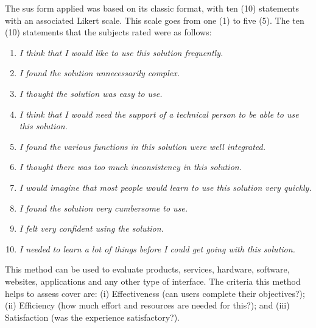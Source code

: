 The \ac{sus} form applied was based on its classic format, with ten (10) statements with an associated Likert scale.
This scale goes from one (1) to five (5).
The ten (10) statements that the subjects rated were as follows:

\begin{enumerate}
    \item {\scriptsize \textit{I think that I would like to use this solution frequently.}}
    \item {\scriptsize \textit{I found the solution unnecessarily complex.}}
    \item {\scriptsize \textit{I thought the solution was easy to use.}}
    \item {\scriptsize \textit{I think that I would need the support of a technical person to be able to use this solution.}}
    \item {\scriptsize \textit{I found the various functions in this solution were well integrated.}}
    \item {\scriptsize \textit{I thought there was too much inconsistency in this solution.}}
    \item {\scriptsize \textit{I would imagine that most people would learn to use this solution very quickly.}}
    \item {\scriptsize \textit{I found the solution very cumbersome to use.}}
    \item {\scriptsize \textit{I felt very confident using the solution.}}
    \item {\scriptsize \textit{I needed to learn a lot of things before I could get going with this solution.}}
\end{enumerate}

This method can be used to evaluate products, services, hardware, software, websites, applications and any other type of interface.
The criteria this method helps to assess cover are: (i) Effectiveness (can users complete their objectives?); (ii) Efficiency (how much effort and resources are needed for this?); and (iii) Satisfaction (was the experience satisfactory?).

